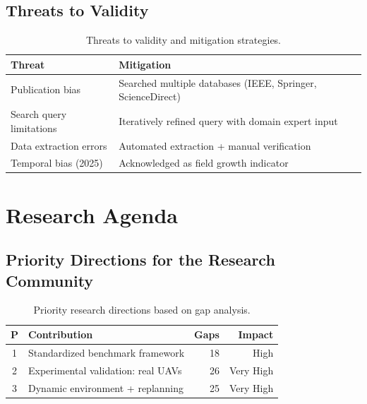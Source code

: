 \documentclass[review,3p,times]{elsarticle}
\begin{document}
\subsection{Threats to Validity}
\begin{table}[htbp]
\centering
\caption{Threats to validity and mitigation strategies.}
\label{tab:threats}
\begin{tabularx}{\textwidth}{lX}
\toprule
\textbf{Threat} & \textbf{Mitigation} \\
\midrule
Publication bias & Searched multiple databases (IEEE, Springer, ScienceDirect) \\
Search query limitations & Iteratively refined query with domain expert input \\
Data extraction errors & Automated extraction + manual verification \\
Temporal bias (2025) & Acknowledged as field growth indicator \\
\bottomrule
\end{tabularx}
\end{table}

\section{Research Agenda}

\subsection{Priority Directions for the Research Community}
\begin{table}[htbp]
\centering
\caption{Priority research directions based on gap analysis.}
\label{tab:priorities}
\begin{tabular}{clrr}
\toprule
\textbf{P} & \textbf{Contribution} & \textbf{Gaps} & \textbf{Impact} \\
\midrule
1 & Standardized benchmark framework & 18 & High \\
2 & Experimental validation: real UAVs & 26 & Very High \\
3 & Dynamic environment + replanning & 25 & Very High \\
\bottomrule
\end{tabular}
\end{table}
\end{document}
